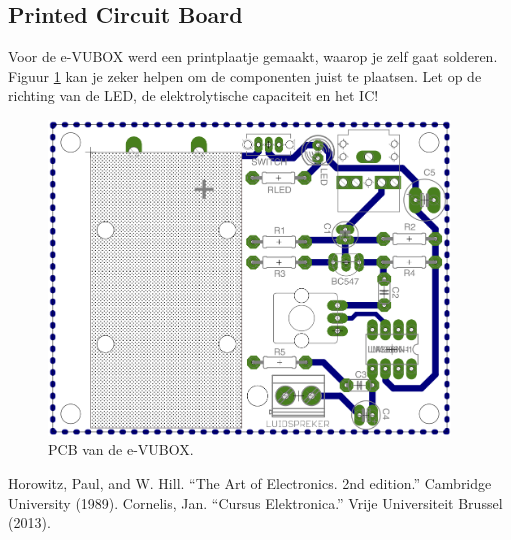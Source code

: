 \documentclass{article}
\begin{document}
			\subsection{Printed Circuit Board}
				Voor de e-VUBOX werd een printplaatje gemaakt, waarop je zelf gaat solderen. Figuur \ref{fig:board} kan je zeker helpen om de componenten juist te plaatsen. Let op de richting van de LED, de elektrolytische capaciteit en het IC!
					\begin{figure}[htbp]
					\centering
					\includegraphics[width=0.95\textwidth]{board.png}
					\caption{PCB van de e-VUBOX.}
					\label{fig:board}
				\end{figure}
\begin{thebibliography}{9}

 Horowitz, Paul, and W. Hill. ``The Art of Electronics. 2nd edition.'' Cambridge University (1989).
 Cornelis, Jan. ``Cursus Elektronica.'' Vrije Universiteit Brussel (2013).

\end{thebibliography}
\end{document}
